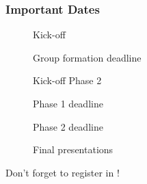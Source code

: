 \begin{frame}
  \frametitle{Important Dates}
  \begin{description}
    \item[\dateKickoffPhaseOne] Kick-off
    \item[\dateDeadlinePhaseTwo] Group formation deadline
    \item[\dateKickoffPhaseTwo] Kick-off Phase 2
    \item[\dateDeadlinePhaseTwo] Phase 1 deadline
    \item[\dateDeadlinePhaseTwo] Phase 2 deadline
    \item[\dateFinal] Final presentations%
  \end{description}
  \vspace{1cm}
  \pause
  \DisplayRightArrow\quad Don't forget to register in !
\end{frame}
